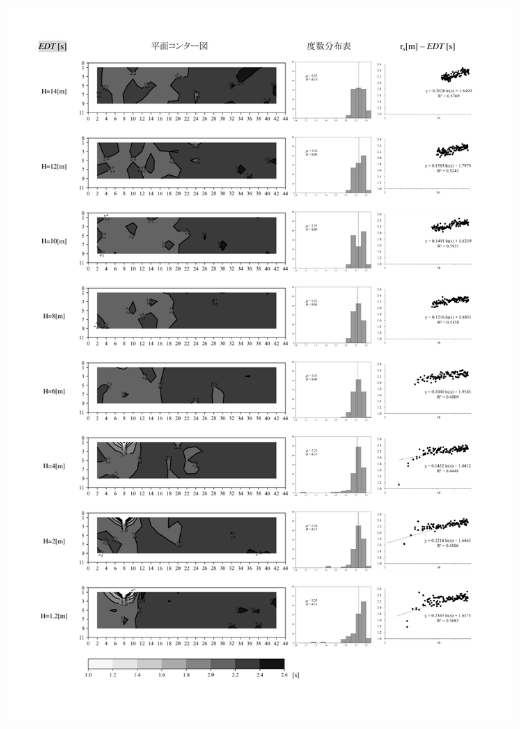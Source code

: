       \begin{minipage}{1\hsize}
        \centering
          \includegraphics[keepaspectratio,width=1\hsize,angle=0]
                          {04_att/Onkyo_rec4.pdf}
      \end{minipage}
\newpage
